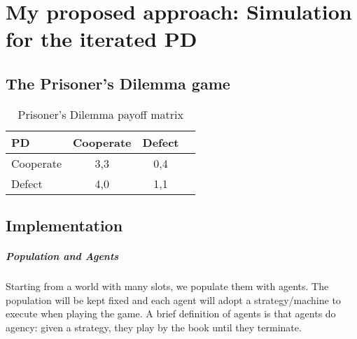 \documentclass[12.5pt]{report}
\begin{document}
\chapter{My proposed approach: Simulation for the iterated PD}

\section{The Prisoner's Dilemma game}

\begin{table}[h!]
\center
\begin{tabular}{l|ccc}
\textbf{PD} & Cooperate & Defect \\
\hline
Cooperate & 3,3 & 0,4 \\
Defect    & 4,0 & 1,1 \\

\end{tabular}
\caption{Prisoner's Dilemma payoff matrix}
\end{table}

\section{Implementation}
\paragraph{Population and Agents}
Starting from a world with many slots, we populate them with agents. The population will be kept fixed and each agent will adopt a strategy/machine to execute when playing the game. A brief definition of agents is that agents do agency: given a strategy, they play by the book until they terminate.
\end{document}
